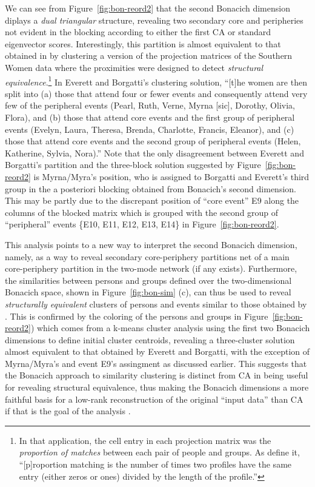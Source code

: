\documentclass[a4paper,fleqn]{cas-sc}
\begin{document}
We can see from Figure~\ref{fig:bon-reord2} that the second Bonacich dimension diplays a \textit{dual triangular} structure, revealing two secondary core and peripheries not evident in the blocking according to either the first CA or standard eigenvector scores. Interestingly, this partition is almost equivalent to that obtained in \citet[Table 5]{everett2013dual} by clustering a version of the projection matrices of the Southern Women data where the proximities were designed to detect \textit{structural equivalence}.\footnote{In that application, the cell entry in each projection matrix was the \textit{proportion of matches} between each pair of people and groups. As \citet[208]{everett2013dual} define it, ``[p]roportion matching is the number of times two profiles have the same entry (either zeros or ones) divided by the length of the profile.''} In Everett and Borgatti's \citeyearpar[208]{everett2013dual} clustering solution, ``[t]he women are then split into (a) those that attend four or fewer events and consequently attend very few of the peripheral events (Pearl, Ruth, Verne, Myrna [sic], Dorothy, Olivia, Flora), and (b) those that attend core events and the first group of peripheral events (Evelyn, Laura, Theresa, Brenda, Charlotte, Francis, Eleanor), and (c) those that attend core events and the second group of peripheral events (Helen, Katherine, Sylvia, Nora).'' Note that the only disagreement between Everett and Borgatti's partition and the three-block solution suggested by Figure~\ref{fig:bon-reord2} is Myrna/Myra's position, who is assigned to Borgatti and Everett's third group in the a posteriori blocking obtained from Bonacich's second dimension. This may be partly due to the discrepant position of ``core event'' E9 along the columns of the blocked matrix which is grouped with the second group of ``peripheral'' events \{E10, E11, E12, E13, E14\} in Figure~\ref{fig:bon-reord2}. 

This analysis points to a new way to interpret the second Bonacich dimension, namely, as a way to reveal secondary core-periphery partitions net of a main core-periphery partition in the two-mode network (if any exists). Furthermore, the similarities between persons and groups defined over the two-dimensional Bonacich space, shown in Figure~\ref{fig:bon-sim} (c), can thus be used to reveal \textit{structurally equivalent} clusters of persons and events similar to those obtained by \citet[Table 5]{everett2013dual}. This is confirmed by the coloring of the persons and groups in Figure~\ref{fig:bon-reord2}) which comes from a k-means cluster analysis using the first two Bonacich dimensions to define initial cluster centroids, revealing a three-cluster solution almost equivalent to that obtained by Everett and Borgatti, with the exception of Myrna/Myra's and event E9's assingment as discussed earlier. This suggests that the Bonacich approach to similarity clustering is distinct from CA in being useful for revealing structural equivalence, thus making the Bonacich dimensions a more faithful basis for a low-rank reconstruction of the original ``input data'' than CA if that is the goal of the analysis \citep{desposito2014comparison}. 
\end{document}
